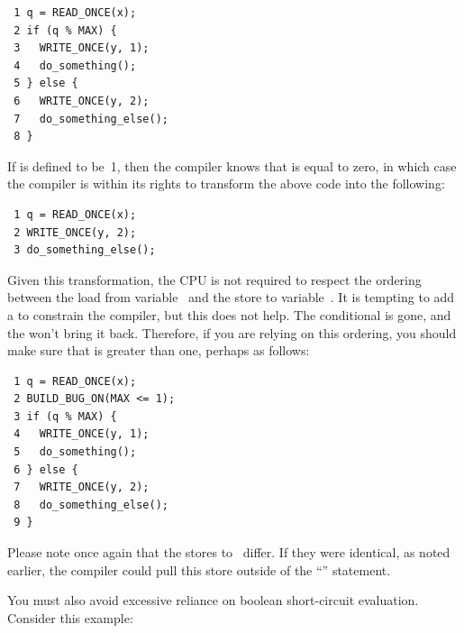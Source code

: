 \vspace{5pt}
\begin{minipage}[t]{\columnwidth}
\scriptsize
\begin{verbatim}
 1 q = READ_ONCE(x);
 2 if (q % MAX) {
 3   WRITE_ONCE(y, 1);
 4   do_something();
 5 } else {
 6   WRITE_ONCE(y, 2);
 7   do_something_else();
 8 }
\end{verbatim}
\end{minipage}
\vspace{5pt}

If  is defined to be~1, then the compiler knows that  is
equal to zero, in which case the compiler is within its rights to
transform the above code into the following:

\vspace{5pt}
\begin{minipage}[t]{\columnwidth}
\scriptsize
\begin{verbatim}
 1 q = READ_ONCE(x);
 2 WRITE_ONCE(y, 2);
 3 do_something_else();
\end{verbatim}
\end{minipage}
\vspace{5pt}

Given this transformation, the CPU is not required to respect the ordering
between the load from variable~ and the store to variable~.
It is tempting to add a  to constrain the compiler,
but this does not help.
The conditional is gone, and the  won't bring it back.
Therefore, if you are relying on this ordering, you should make sure
that  is greater than one, perhaps as follows:

\vspace{5pt}
\begin{minipage}[t]{\columnwidth}
\scriptsize
\begin{verbatim}
 1 q = READ_ONCE(x);
 2 BUILD_BUG_ON(MAX <= 1);
 3 if (q % MAX) {
 4   WRITE_ONCE(y, 1);
 5   do_something();
 6 } else {
 7   WRITE_ONCE(y, 2);
 8   do_something_else();
 9 }
\end{verbatim}
\end{minipage}
\vspace{5pt}

Please note once again that the stores to~ differ.
If they were identical, as noted earlier, the compiler could pull this
store outside of the ``'' statement.

You must also avoid excessive reliance on boolean short-circuit evaluation.
Consider this example:

